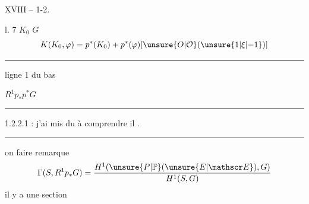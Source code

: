 \uline{$\overline{\mathrm{XVIII}}$} -- 1-2.

 l. 7 \qquad $K_0$    $G$
\[
K(K_0,\varphi)=p^*(K_0)+p^*(\varphi)[\unsure{O|\mathcal O}(\unsure{1|\xi|{-}1})]
\]

\par\noindent\rule{.8\linewidth}{.2pt}

 ligne 1 du bas

  $R^1p_*p^*G$

\par\noindent\hspace*{2em}\rule{.35\linewidth}{.2pt}

 1.2.2.1 : j'ai mis du  à comprendre
  il  .

\par\noindent\rule{.9\linewidth}{.2pt}

on  faire remarque
\[
\Gamma(S,R^1p_*G)=\frac{H^1(\unsure{P|\mathbb P}(\unsure{E|\mathscr E}),G)}{H^1(S,G)}
\]
 il y a une section

